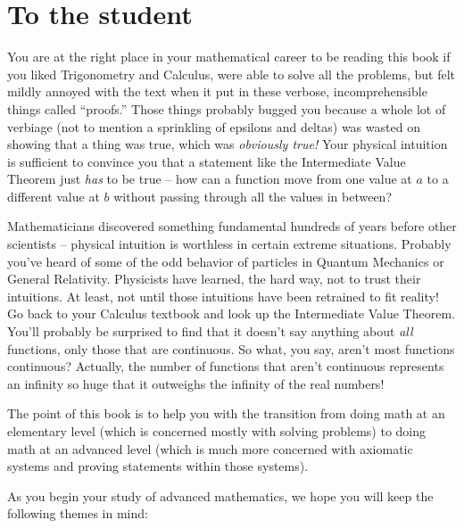 \chapter*{To the student}

You are at the right place in your mathematical career to be
reading this book if you liked Trigonometry and Calculus,
were able to solve all the problems, but felt mildly annoyed
with the text when it put in these verbose, incomprehensible 
things called ``proofs.''   Those things probably bugged you
because a whole lot of verbiage (not to mention a sprinkling 
of epsilons and deltas) was wasted on showing that a thing 
was true, which was {\em obviously true!}  Your physical intuition
is sufficient to convince you that a statement like the 
Intermediate Value Theorem just {\em has} to be true -- how 
can a function move from one value at $a$ to a different value
at $b$ without passing through all the values in between?

Mathematicians discovered something fundamental hundreds of
years before other scientists -- physical intuition is worthless
in certain extreme situations.  Probably you've heard of some
of the odd behavior of particles in Quantum Mechanics or General
Relativity.  Physicists have learned, the hard way, not to trust
their intuitions.  At least, not until those intuitions have
been retrained to fit reality!  Go back to your Calculus textbook
and look up the Intermediate Value Theorem.  You'll probably
be surprised to find that it doesn't say anything about {\em all}
functions, only those that are continuous.  So what, you say,
aren't most functions continuous?  Actually, the number of functions
that aren't continuous represents an infinity so huge that it
outweighs the infinity of the real numbers! 

The point of this book is to help you with the transition from
doing math at an elementary level (which is concerned mostly with 
solving problems) to doing math at an advanced level (which is 
much more concerned with axiomatic systems and proving statements
within those systems).  

As you begin your study of advanced mathematics, we hope you will
keep the following themes in mind:

